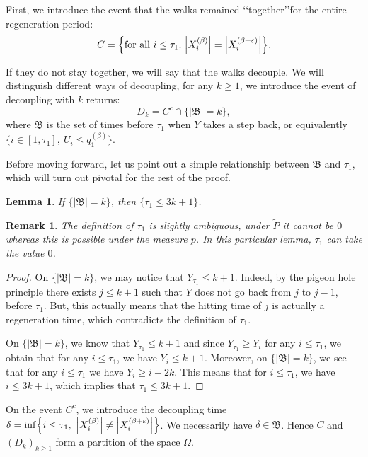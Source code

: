 \documentclass[12pt]{amsart}
\numberwithin{equation}{section}
\newtheorem{lemma}{Lemma}[section]
\newtheorem{remark}{Remark}[section]
\begin{document}
 First, we introduce the event that the walks remained \lq\lq together\rq\rq for the entire regeneration period:
\[
C=\Bigl\{\text{for all $i\leq \tau_1$, }{\left\vert {X_i^{(\beta)}}\right\vert}={\left\vert {X_i^{(\beta+{\varepsilon})}}\right\vert}\Bigr\}.
\]

If they do not stay together, we will say that the walks decouple. We will distinguish different ways of decoupling, for any $k\geq 1$, we introduce the event of decoupling with $k$ returns:
\[
D_k=C^c\cap \{{\left\vert {\mathfrak{B}}\right\vert}=k\},
\]
where $\mathfrak{B}$ is the set of times before $\tau_1$ when $Y$ takes a step back, or equivalently $\{i\in[1, \tau_1],~U_i\leq q_1^{(\beta)}\}$.

Before moving forward, let us point out a simple relationship between $\mathfrak{B}$ and $\tau_1$, which will turn out pivotal for the rest of the proof. 
 \begin{lemma}\label{rem_b}
If $\{{\left\vert {\mathfrak{B}}\right\vert}=k\}$, then $\{\tau_1\leq 3k+1\}$. 
\end{lemma}
\begin{remark} The definition of $\tau_1$ is slightly ambiguous, under $\tilde{P}$ it cannot be $0$ whereas this is possible under the measure $p$. In this particular lemma, $\tau_1$ can take the value $0$.
\end{remark}
\begin{proof}
On $\{{\left\vert {\mathfrak{B}}\right\vert}=k\}$, we may notice that $Y_{\tau_1}\leq k+1$. Indeed, by the pigeon hole principle there exists $j\leq k+1$ such that $Y$ does not go back from $j$ to $j-1$, before $\tau_1$. But, this actually means that the hitting time of $j$ is actually a regeneration time, which contradicts the definition of $\tau_1$.

On $\{{\left\vert {\mathfrak{B}}\right\vert}=k\}$, we know that $Y_{\tau_1}\leq k+1$ and since $Y_{\tau_1}\geq Y_i$ for any $i\leq \tau_1$, we obtain that for any $i\leq \tau_1$, we have $Y_i\leq k+1$. Moreover, on $\{{\left\vert {\mathfrak{B}}\right\vert}=k\}$, we see that for any $i\leq \tau_1$ we have $Y_i\geq i-2k$. This means that for $i\leq \tau_1$, we have $i\leq 3k+1$,  which implies that $\tau_1\leq 3k+1$.
\end{proof} 

On the event $C^c$, we introduce the decoupling time $\delta=\inf\Bigl\{i\leq \tau_1,~{\left\vert {X_i^{(\beta)}}\right\vert}\neq {\left\vert {X_i^{(\beta+{\varepsilon})}}\right\vert}\Bigr\}$. We necessarily have $\delta \in \mathfrak{B}$. Hence $C$ and $(D_k)_{k\geq 1}$ form a partition of the space $\Omega$.
\end{document}
